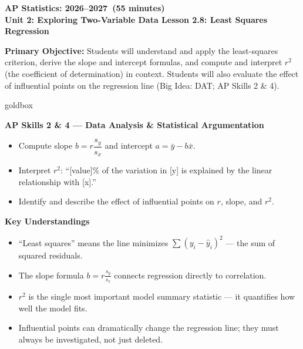\documentclass[10pt]{article}
\newcommand{\CourseName}{AP Statistics}
\newcommand{\SchoolYear}{2026--2027}
\newcommand{\MeetingLength}{55 minutes}
\newcommand{\UnitNumberName}{Unit 2: Exploring Two-Variable Data \quad}
\newcommand{\LessonNumberName}{Lesson 2.8: Least Squares Regression}
\begin{document}
\begin{center}
    {\Large\bfseries \CourseName: \SchoolYear\ (\MeetingLength) \\
    {\small\bfseries \UnitNumberName \LessonNumberName}}
\end{center}

\begin{tcolorbox}[colback=sky,colframe=navy,boxrule=0.9pt,arc=2mm,
    left=2mm,right=2mm,top=1.5mm,bottom=1.5mm]
    \textbf{Primary Objective:} Students will understand and apply the least-squares criterion,
    derive the slope and intercept formulas, and compute and interpret $r^2$ (the coefficient of
    determination) in context. Students will also evaluate the effect of influential points on the
    regression line (Big Idea: DAT; AP Skills 2 \& 4).
\end{tcolorbox}

\begin{skillbox}{goldbox}
\begin{minipage}[t]{0.48\linewidth}
    \textbf{AP Skills 2 \& 4 --- Data Analysis \& Statistical Argumentation}
    \begin{itemize}
        \item Compute slope $b = r\dfrac{s_y}{s_x}$ and intercept $a = \bar{y} - b\bar{x}$.
        \item Interpret $r^2$: ``[value]\% of the variation in [y] is explained by the linear relationship with [x].''
        \item Identify and describe the effect of influential points on $r$, slope, and $r^2$.
    \end{itemize}
\end{minipage}
\hfill
\begin{minipage}[t]{0.48\linewidth}
    \textbf{Key Understandings}
    \begin{itemize}
        \item ``Least squares'' means the line minimizes $\sum(y_i - \hat{y}_i)^2$ --- the sum of squared residuals.
        \item The slope formula $b = r\frac{s_y}{s_x}$ connects regression directly to correlation.
        \item $r^2$ is the single most important model summary statistic --- it quantifies how well the model fits.
        \item Influential points can dramatically change the regression line; they must always be investigated, not just deleted.
    \end{itemize}
\end{minipage}
\end{skillbox}
\end{document}

